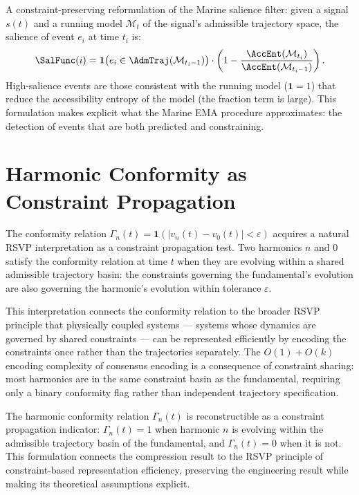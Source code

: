 \begin{salvage}
A constraint-preserving reformulation of the Marine
salience filter: given a signal $s(t)$ and a running
model $\mathcal{M}_t$ of the signal's admissible
trajectory space, the salience of event $e_i$ at
time $t_i$ is:
\[
  \SalFunc(i)
  = \mathbf{1}\bigl(e_i \in \AdmTraj(\mathcal{M}_{t_i-1})\bigr)
  \cdot \left(1 - \frac{\AccEnt(\mathcal{M}_{t_i})}
    {\AccEnt(\mathcal{M}_{t_i-1})}\right).
\]
High-salience events are those consistent with the
running model ($\mathbf{1} = 1$) that reduce the
accessibility entropy of the model (the fraction
term is large). This formulation makes explicit
what the Marine EMA procedure approximates: the
detection of events that are both predicted and
constraining.
\end{salvage}

\section{Harmonic Conformity as Constraint Propagation}
\label{sec:conformity-propagation}

The \HCFone{} conformity relation $\Gamma_n(t) =
\mathbf{1}(|v_n(t) - v_0(t)| < \varepsilon)$ acquires
a natural RSVP interpretation as a constraint propagation
test. Two harmonics $n$ and $0$ satisfy the conformity
relation at time $t$ when they are evolving within
a shared admissible trajectory basin: the constraints
governing the fundamental's evolution are also governing
the harmonic's evolution within tolerance $\varepsilon$.

This interpretation connects the \HCFone{} conformity
relation to the broader RSVP principle that physically
coupled systems --- systems whose dynamics are governed
by shared constraints --- can be represented efficiently
by encoding the constraints once rather than the
trajectories separately. The $O(1) + O(k)$ encoding
complexity of consensus encoding is a consequence
of constraint sharing: most harmonics are in the same
constraint basin as the fundamental, requiring only
a binary conformity flag rather than independent
trajectory specification.

\begin{auditprop}
\label{ap:conformity-rsvp}
The harmonic conformity relation $\Gamma_n(t)$ is
reconstructible as a constraint propagation indicator:
$\Gamma_n(t) = 1$ when harmonic $n$ is evolving within
the admissible trajectory basin of the fundamental,
and $\Gamma_n(t) = 0$ when it is not. This formulation
connects the \HCFone{} compression result to the RSVP
principle of constraint-based representation efficiency,
preserving the engineering result while making its
theoretical assumptions explicit.
\end{auditprop}

